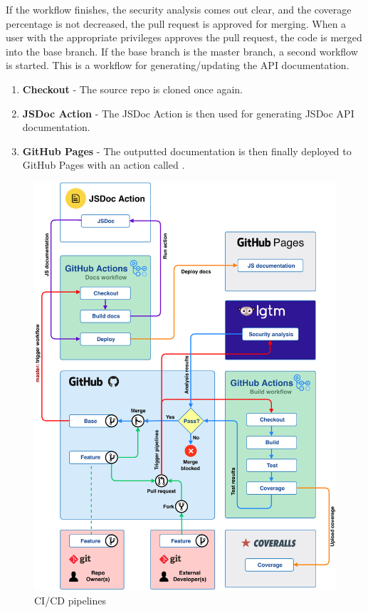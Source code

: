If the workflow finishes, the security analysis comes out clear, and the coverage percentage is not decreased, the pull request is approved for merging. When a user with the appropriate privileges approves the pull request, the code is merged into the base branch. If the base branch is the master branch, a second workflow is started. This is a workflow for generating/updating the API documentation.

\begin{enumerate}
    \item \textbf{Checkout} - The source repo is cloned once again.
    \item \textbf{JSDoc Action} - The JSDoc Action is then used for generating JSDoc API documentation.
    \item \textbf{GitHub Pages} - The outputted documentation is then finally deployed to GitHub Pages with an action called \cite{github-pages-action}.
\end{enumerate}

\begin{figure}[hp!]
    \setlength{\abovecaptionskip}{25pt}
    \centering
    \includegraphics[page=1,scale=1]{sections/methodology/figures/pipelines.pdf}
    \caption{CI/CD pipelines}
    \label{fig:cicd-pipelines}
\end{figure}

